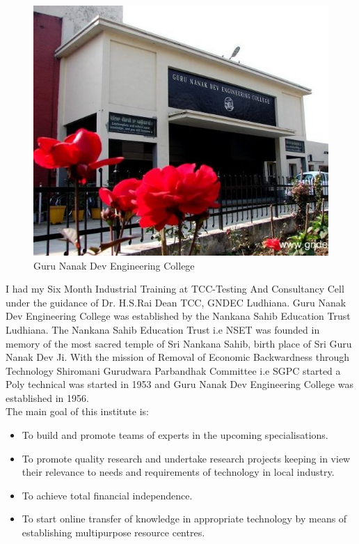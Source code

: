 \begin{figure}[ht]
\centering
\includegraphics[scale=0.5]{input/images/gndec.jpg}
\caption{Guru Nanak Dev Engineering College}
\end{figure}
\hspace{-1.7em} I had my Six Month Industrial Training at TCC-Testing And Consultancy Cell under the guidance of Dr. H.S.Rai Dean TCC, GNDEC Ludhiana. Guru Nanak Dev Engineering College was established by the Nankana
Sahib Education Trust Ludhiana. The Nankana Sahib Education Trust i.e NSET
was founded in memory of the most sacred temple of Sri Nankana Sahib, birth place
of Sri Guru Nanak Dev Ji. With the mission of Removal of Economic Backwardness
through Technology Shiromani Gurudwara Parbandhak Committee i.e SGPC started a
Poly technical was started in 1953 and Guru Nanak Dev Engineering College was established in 1956.\\


The main goal of this institute is:
\begin{itemize}
\item To build and promote teams of experts in the upcoming specialisations.
\item To promote quality research and undertake research projects keeping in view their
relevance to needs and requirements of technology in local industry.
\item To achieve total financial independence.
\item To start online transfer of knowledge in appropriate technology by means of establishing multipurpose resource centres.
\end{itemize}
